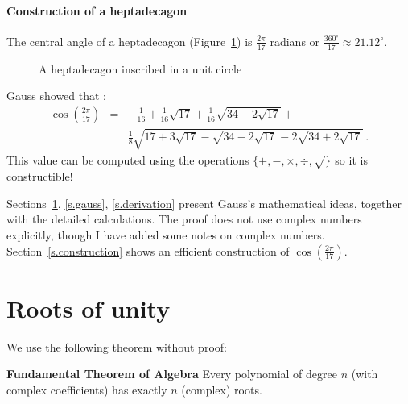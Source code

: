 \documentclass[11pt,a4paper]{article}
\newenvironment{form}[1]{%
\begin{displaymath}%
\renewcommand{\arraystretch}{#1}%
\begin{array}{lcl}}%
{\end{array}%
\end{displaymath}%
}
\newcommand*{\disfrac}[2]{\displaystyle\frac{#1}{#2}}
\newcommand*{\sm}[1]{$\scriptstyle #1$}
\begin{document}
\paragraph{Construction of a heptadecagon}
The central angle of a heptadecagon  (Figure~\ref{fig.hept}) is $\disfrac{2\pi}{17}$ radians or $\disfrac{360^\circ}{17}\approx 21.12^\circ$. 
\begin{figure}[bt]
\begin{center}
\caption{A heptadecagon inscribed in a unit circle}\label{fig.hept}
\end{center}
\end{figure}
Gauss showed that \cite{jorg,gauss}:
\begin{form}{3}
\cos\left(\disfrac{2\pi}{17}\right) &=& 
-\disfrac{1}{16}+\disfrac{1}{16}\sqrt{17} + 
     \disfrac{1}{16}\sqrt{34-2\sqrt{17}}
    + \\
    &&
     \disfrac{1}{8}\sqrt{
     17+3\sqrt{17} - 
     \sqrt{34-2\sqrt{17}}
   -2
     \sqrt{34+2\sqrt{17}}
   }\,.
\end{form}
This value can be computed using the operations $\{+,-,\times,\div,\surd\}$ so it is constructible!

Sections~\ref{s.roots}, \ref{s.gauss}, \ref{s.derivation} present Gauss's mathematical ideas, together with the detailed calculations. The proof does not use complex numbers explicitly, though I have added some notes on complex numbers. Section~\ref{s.construction} shows an efficient construction of $\cos\left(\disfrac{2\pi}{17}\right)$.

\section{Roots of unity}\label{s.roots}

We use the following theorem without proof:

\textbf{Fundamental Theorem of Algebra} Every polynomial of degree $n$ (with complex coefficients) has exactly $n$ (complex) roots.
\end{document}
